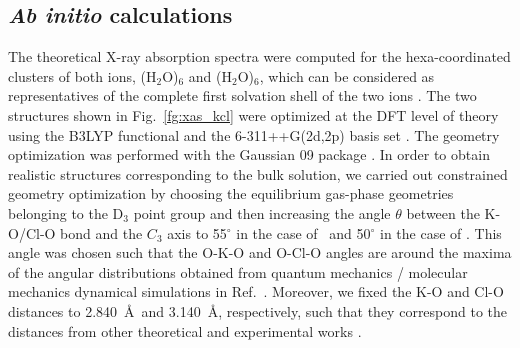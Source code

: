 \subsection{{\bf{\it Ab initio}} calculations}

The theoretical X-ray absorption spectra were computed for the hexa-coordinated clusters of both ions, \ki(H$_2$O)$_6$ and \cli(H$_2$O)$_6$, which can be considered as representatives of the complete first solvation shell of the two ions \citep{Ohtaki93:1157,soper06:180,ma14:1006}. The two structures shown in Fig.\ \ref{fg:xas_kcl} were optimized at the DFT level of theory using the B3LYP functional and the 6-311++G(2d,2p) basis set \citep{Krishnan80:650,Blaudeau97:5016}. The geometry optimization was performed with the Gaussian 09 package \citep{g09}. In order to obtain realistic structures corresponding to the bulk solution, we carried out constrained geometry optimization by choosing the equilibrium gas-phase geometries \citep{lee99:3995,lee02:5509} belonging to the D$_3$ point group and then increasing the angle $\theta$ between the K-O/Cl-O bond and the $C_3$ axis to 55$^{\circ}$ in the case of \ki~and 50$^{\circ}$ in the case of \cli. This angle was chosen such that the O-K-O and O-Cl-O angles are around the maxima of the angular distributions obtained from quantum mechanics / molecular mechanics dynamical simulations in Ref.\ \citep{ma14:1006}. Moreover, we fixed the K-O and Cl-O distances to 2.840~\AA~and 3.140~\AA, respectively, such that they correspond to the distances from other theoretical and experimental works \citep{ge13:13169,gora00:7,Ohtaki93:1157,soper06:180,ma14:1006}.


